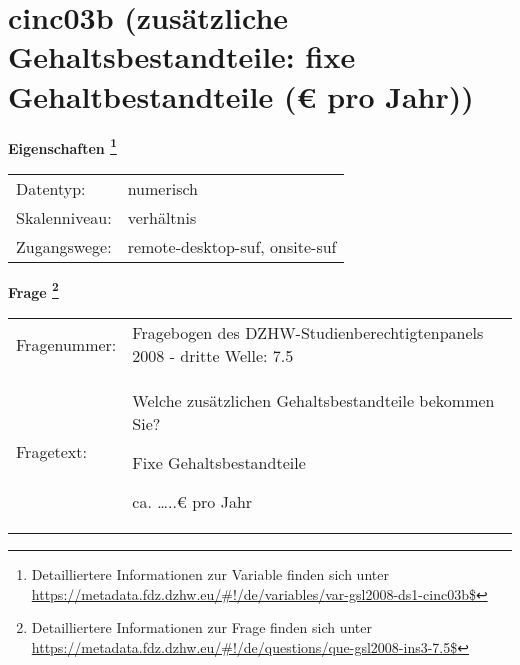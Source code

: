 
    \setcounter{footnote}{0}

    \vspace*{-1.8cm}
	\section{cinc03b (zusätzliche Gehaltsbestandteile: fixe Gehaltbestandteile (€ pro Jahr))}
	\label{section:cinc03b}



    \vspace*{0.5cm}
    \noindent\textbf{Eigenschaften
	\footnote{Detailliertere Informationen zur Variable finden sich unter
		\url{https://metadata.fdz.dzhw.eu/\#!/de/variables/var-gsl2008-ds1-cinc03b$}}}\\
	\begin{tabularx}{\hsize}{@{}lX}
	Datentyp: & numerisch \\
	Skalenniveau: & verhältnis \\
	Zugangswege: &
	  remote-desktop-suf, 
	  onsite-suf
 \\
    \end{tabularx}



				\vspace*{0.5cm}
                \noindent\textbf{Frage
	                \footnote{Detailliertere Informationen zur Frage finden sich unter
		              \url{https://metadata.fdz.dzhw.eu/\#!/de/questions/que-gsl2008-ins3-7.5$}}}\\
				\begin{tabularx}{\hsize}{@{}lX}
					Fragenummer: &
					  Fragebogen des DZHW-Studienberechtigtenpanels 2008 - dritte Welle:
					  7.5
 \\
					Fragetext: & Welche zusätzlichen Gehaltsbestandteile bekommen Sie?\par  Fixe Gehaltsbestandteile\par  ca. …..€ pro Jahr \\
				\end{tabularx}





